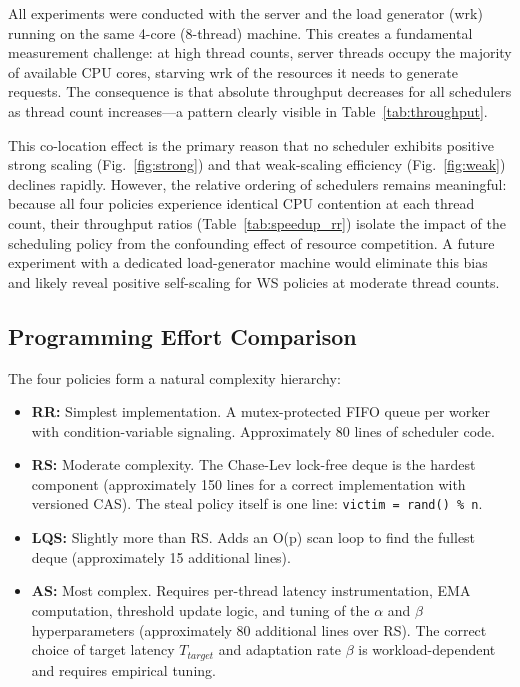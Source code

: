 \documentclass[conference]{IEEEtran}
\begin{document}
All experiments were conducted with the server and the load generator (wrk) running on the same 4-core (8-thread) machine. This creates a fundamental measurement challenge: at high thread counts, server threads occupy the majority of available CPU cores, starving wrk of the resources it needs to generate requests. The consequence is that absolute throughput decreases for all schedulers as thread count increases---a pattern clearly visible in Table~\ref{tab:throughput}.

This co-location effect is the primary reason that no scheduler exhibits positive strong scaling (Fig.~\ref{fig:strong}) and that weak-scaling efficiency (Fig.~\ref{fig:weak}) declines rapidly. However, the relative ordering of schedulers remains meaningful: because all four policies experience identical CPU contention at each thread count, their throughput ratios (Table~\ref{tab:speedup_rr}) isolate the impact of the scheduling policy from the confounding effect of resource competition. A future experiment with a dedicated load-generator machine would eliminate this bias and likely reveal positive self-scaling for WS policies at moderate thread counts.

\subsection{Programming Effort Comparison}

The four policies form a natural complexity hierarchy:

\begin{itemize}
    \item \textbf{RR:} Simplest implementation. A mutex-protected FIFO queue per worker with condition-variable signaling. Approximately 80 lines of scheduler code.
    \item \textbf{RS:} Moderate complexity. The Chase-Lev lock-free deque is the hardest component (approximately 150 lines for a correct implementation with versioned CAS). The steal policy itself is one line: \texttt{victim = rand() \% n}.
    \item \textbf{LQS:} Slightly more than RS. Adds an O(p) scan loop to find the fullest deque (approximately 15 additional lines).
    \item \textbf{AS:} Most complex. Requires per-thread latency instrumentation, EMA computation, threshold update logic, and tuning of the $\alpha$ and $\beta$ hyperparameters (approximately 80 additional lines over RS). The correct choice of target latency $T_{target}$ and adaptation rate $\beta$ is workload-dependent and requires empirical tuning.
\end{itemize}
\end{document}
